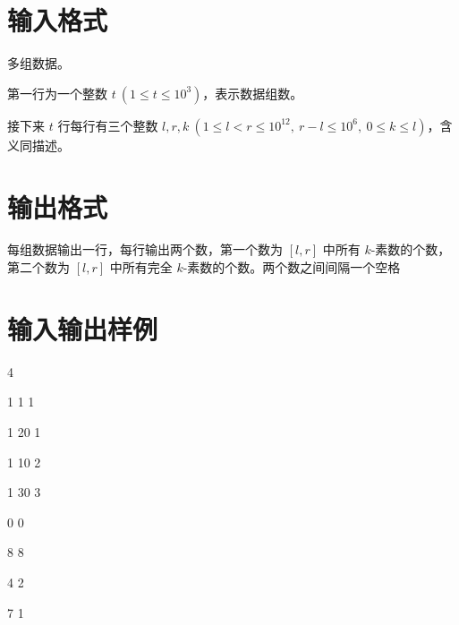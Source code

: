\documentclass{ctpro}
\begin{document}
\section*{输入格式}

多组数据。

第一行为一个整数 $t~(1 \leq t \leq {10}^3)$，表示数据组数。

接下来 $t$ 行每行有三个整数 $l,r,k~(1 \leq l<r \leq {10}^{12},~r-l\leq {10}^6,~0 \leq k \leq l)$，含义同描述。

\section*{输出格式}

每组数据输出一行，每行输出两个数，第一个数为 $[l,r]$ 中所有 $k$-素数的个数，第二个数为 $[l,r]$ 中所有完全 $k$-素数的个数。两个数之间间隔一个空格

\section*{输入输出样例}

\testcasetab
{
4\par
1 1 1\par
1 20 1\par
1 10 2\par
1 30 3
}
{
0 0\par
8 8\par
4 2\par
7 1
}
\end{document}
